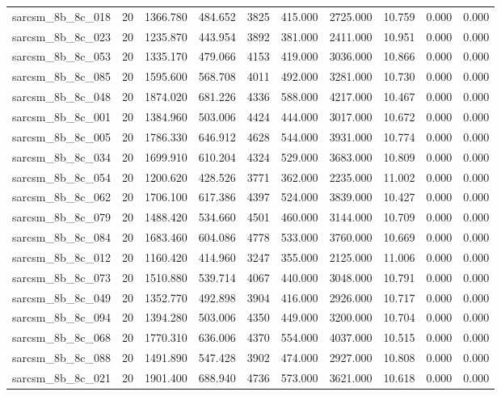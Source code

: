 \begin{tabular}{lrrrrrrrrr}
sarcsm\_8b\_8c\_018 & 20 & 1366.780 & 484.652 & 3825 & 415.000 & 2725.000 & 10.759 & 0.000 & 0.000 \\
sarcsm\_8b\_8c\_023 & 20 & 1235.870 & 443.954 & 3892 & 381.000 & 2411.000 & 10.951 & 0.000 & 0.000 \\
sarcsm\_8b\_8c\_053 & 20 & 1335.170 & 479.066 & 4153 & 419.000 & 3036.000 & 10.866 & 0.000 & 0.000 \\
sarcsm\_8b\_8c\_085 & 20 & 1595.600 & 568.708 & 4011 & 492.000 & 3281.000 & 10.730 & 0.000 & 0.000 \\
sarcsm\_8b\_8c\_048 & 20 & 1874.020 & 681.226 & 4336 & 588.000 & 4217.000 & 10.467 & 0.000 & 0.000 \\
sarcsm\_8b\_8c\_001 & 20 & 1384.960 & 503.006 & 4424 & 444.000 & 3017.000 & 10.672 & 0.000 & 0.000 \\
sarcsm\_8b\_8c\_005 & 20 & 1786.330 & 646.912 & 4628 & 544.000 & 3931.000 & 10.774 & 0.000 & 0.000 \\
sarcsm\_8b\_8c\_034 & 20 & 1699.910 & 610.204 & 4324 & 529.000 & 3683.000 & 10.809 & 0.000 & 0.000 \\
sarcsm\_8b\_8c\_054 & 20 & 1200.620 & 428.526 & 3771 & 362.000 & 2235.000 & 11.002 & 0.000 & 0.000 \\
sarcsm\_8b\_8c\_062 & 20 & 1706.100 & 617.386 & 4397 & 524.000 & 3839.000 & 10.427 & 0.000 & 0.000 \\
sarcsm\_8b\_8c\_079 & 20 & 1488.420 & 534.660 & 4501 & 460.000 & 3144.000 & 10.709 & 0.000 & 0.000 \\
sarcsm\_8b\_8c\_084 & 20 & 1683.460 & 604.086 & 4778 & 533.000 & 3760.000 & 10.669 & 0.000 & 0.000 \\
sarcsm\_8b\_8c\_012 & 20 & 1160.420 & 414.960 & 3247 & 355.000 & 2125.000 & 11.006 & 0.000 & 0.000 \\
sarcsm\_8b\_8c\_073 & 20 & 1510.880 & 539.714 & 4067 & 440.000 & 3048.000 & 10.791 & 0.000 & 0.000 \\
sarcsm\_8b\_8c\_049 & 20 & 1352.770 & 492.898 & 3904 & 416.000 & 2926.000 & 10.717 & 0.000 & 0.000 \\
sarcsm\_8b\_8c\_094 & 20 & 1394.280 & 503.006 & 4350 & 449.000 & 3200.000 & 10.704 & 0.000 & 0.000 \\
sarcsm\_8b\_8c\_068 & 20 & 1770.310 & 636.006 & 4370 & 554.000 & 4037.000 & 10.515 & 0.000 & 0.000 \\
sarcsm\_8b\_8c\_088 & 20 & 1491.890 & 547.428 & 3902 & 474.000 & 2927.000 & 10.808 & 0.000 & 0.000 \\
sarcsm\_8b\_8c\_021 & 20 & 1901.400 & 688.940 & 4736 & 573.000 & 3621.000 & 10.618 & 0.000 & 0.000 \\

\end{tabular}
